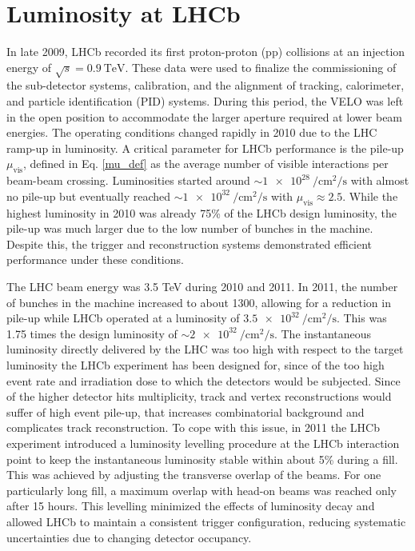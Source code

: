 \section{Luminosity at LHCb}
In late 2009, LHCb recorded its first proton-proton (pp) collisions at an injection energy of $\sqrt{s}=\SI{0.9}{\tera\eV}$. These data were used to finalize the commissioning of the sub-detector systems, calibration, and the alignment of tracking, calorimeter, and particle identification (PID) systems. During this period, the VELO was left in the open position to accommodate the larger aperture required at lower beam energies.
The operating conditions changed rapidly in 2010 due to the LHC ramp-up in luminosity. A critical parameter for LHCb performance is the pile-up \(\mu_{\text{vis}}\), defined in Eq. \ref{mu_def} as the average number of visible interactions per beam-beam crossing. Luminosities started around $\sim \SI{1e28}{\per\centi\meter\squared\per\second}$ with almost no pile-up but eventually reached $\sim \SI{1e32}{\per\centi\meter\squared\per\second}$ with $\mu_{\text{vis}} \approx 2.5$.
While the highest luminosity in 2010 was already 75\% of the LHCb design luminosity, the pile-up was much larger due to the low number of bunches in the machine. Despite this, the trigger and reconstruction systems demonstrated efficient performance under these conditions\cite{det_perf}.


The LHC beam energy was 3.5 TeV during 2010 and 2011. In 2011, the number of bunches in the machine increased to about 1300, allowing for a reduction in pile-up while LHCb operated at a luminosity of $\SI{3.5e32}{\per\centi\meter\squared\per\second}$. This was 1.75 times the design luminosity of $\sim \SI{2e32}{\per\centi\meter\squared\per\second}$. The instantaneous luminosity directly delivered by the LHC was too high with respect to the target luminosity the LHCb experiment has been designed for, since of the too high event rate and irradiation dose to which the detectors would be subjected. Since of the higher detector hits multiplicity, track and vertex reconstructions would suffer of high event pile-up, that increases combinatorial background and complicates track reconstruction.
To cope with this issue, in 2011 the LHCb experiment introduced a luminosity levelling procedure at the LHCb interaction point to keep the instantaneous luminosity stable within about 5\% during a fill. This was achieved by adjusting the transverse overlap of the beams. For one particularly long fill, a maximum overlap with head-on beams was reached only after 15 hours. This levelling minimized the effects of luminosity decay and allowed LHCb to maintain a consistent trigger configuration, reducing systematic uncertainties due to changing detector occupancy.

